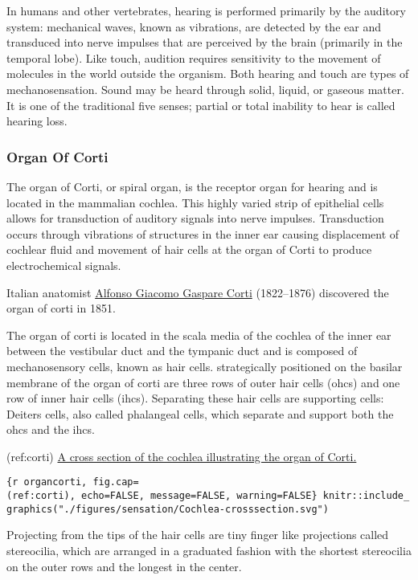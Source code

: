 In humans and other vertebrates, hearing is performed primarily by the
auditory system: mechanical waves, known as vibrations, are detected by
the ear and transduced into nerve impulses that are perceived by the
brain (primarily in the temporal lobe). Like touch, audition requires
sensitivity to the movement of molecules in the world outside the
organism. Both hearing and touch are types of mechanosensation. Sound
may be heard through solid, liquid, or gaseous matter. It is one of the
traditional five senses; partial or total inability to hear is called
hearing loss.

\hypertarget{organ-of-corti}{%
\subsubsection{Organ Of Corti}\label{organ-of-corti}}

The organ of Corti, or spiral organ, is the receptor organ for hearing
and is located in the mammalian cochlea. This highly varied strip of
epithelial cells allows for transduction of auditory signals into nerve
impulses. Transduction occurs through vibrations of structures in the
inner ear causing displacement of cochlear fluid and movement of hair
cells at the organ of Corti to produce electrochemical signals.

Italian anatomist
\href{https://en.wikipedia.org/wiki/Alfonso_Giacomo_Gaspare_Corti}{Alfonso
Giacomo Gaspare Corti} (1822--1876) discovered the organ of corti in
1851.

The organ of corti is located in the scala media of the cochlea of the
inner ear between the vestibular duct and the tympanic duct and is
composed of mechanosensory cells, known as hair cells. strategically
positioned on the basilar membrane of the organ of corti are three rows
of outer hair cells (ohcs) and one row of inner hair cells (ihcs).
Separating these hair cells are supporting cells: Deiters cells, also
called phalangeal cells, which separate and support both the ohcs and
the ihcs.

(ref:corti)
\href{https://commons.wikimedia.org/wiki/File:Cochlea-crosssection.svg}{A
cross section of the cochlea illustrating the organ of Corti.}

\texttt{\{r\ organcorti,\ fig.cap=\textquotesingle{}(ref:corti)\textquotesingle{},\ echo=FALSE,\ message=FALSE,\ warning=FALSE\}\ knitr::include\_graphics("./figures/sensation/Cochlea-crosssection.svg")}

Projecting from the tips of the hair cells are tiny finger like
projections called stereocilia, which are arranged in a graduated
fashion with the shortest stereocilia on the outer rows and the longest
in the center.

